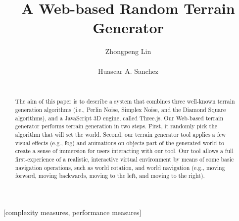 \documentclass{acm_proc_article-sp}
\begin{document}
\title{A Web-based Random Terrain Generator}
\author{
  \alignauthor Zhongpeng Lin \\
   \\
  \alignauthor Huascar A. Sanchez \\
   \\
}

\maketitle
\begin{abstract}
The aim of this paper is to describe a system that combines three well-known terrain generation algorithms (i.e., Perlin Noise, Simplex Noise, and the Diamond Square algorithms), and a JavaScript 3D engine, called Three.js. Our Web-based terrain generator performs terrain generation in two steps. First, it randomly pick the algorithm that will set the world. Second, our terrain generator tool applies a few visual effects (e.g., fog) and animations on objects part of the generated world to create a sense of immersion for users interacting with our tool. Our tool allows a full first-experience of a realistic, interactive virtual environment by means of some basic navigation operations, such as world rotation, and world navigation (e.g., moving forward, moving backwards, moving to the left, and moving to the right). 
\end{abstract}

[complexity measures, performance measures]











\end{document}
